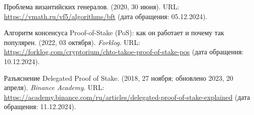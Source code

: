 \begin{thebibliography}{9}
Проблема византийских генералов. (2020, 30 июня). URL: \url{https://vmath.ru/vf5/algorithms/bft} (дата обращения: 05.12.2024).

Алгоритм консенсуса Proof-of-Stake (PoS): как он работает и почему так популярен. (2022, 03 октября). \textit{Forklog}. URL: \url{https://forklog.com/cryptorium/chto-takoe-proof-of-stake-pos} (дата обращения: 10.12.2024).

Разъяснение Delegated Proof of Stake. (2018, 27 ноября; обновлено 2023, 20 апреля). \textit{Binance Academy}. URL: \url{https://academy.binance.com/ru/articles/delegated-proof-of-stake-explained} (дата обращения: 11.12.2024).

\end{thebibliography}
